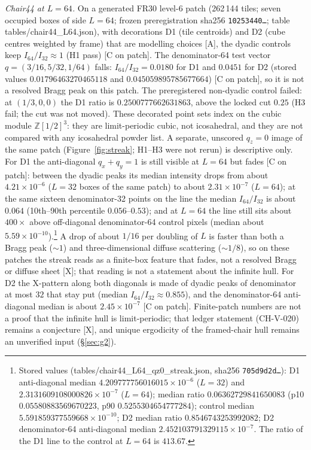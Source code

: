\documentclass[11pt]{article}
\begin{document}
\emph{Chair44 at $L=64$.} On a generated FR30 level-6 patch (262\,144 tiles; seven occupied boxes of side $L=64$; frozen preregistration sha256 \texttt{10253440\ldots}; table tables/chair44\_L64.json), with decorations D1 (tile centroids) and D2 (cube centres weighted by frame) that are modelling choices [A], the dyadic controls keep $I_{64}/I_{32}\approx1$ (H1 pass) [C on patch]. The denominator-64 test vector $q=(3/16,5/32,1/64)$ falls: $I_{64}/I_{32}=0.0180$ for D1 and $0.0451$ for D2 (stored values $0.01796463270465118$ and $0.045059895785677664$) [C on patch], so it is not a resolved Bragg peak on this patch. The preregistered non-dyadic control failed: at $(1/3,0,0)$ the D1 ratio is $0.2500777662631863$, above the locked cut $0.25$ (H3 fail; the cut was not moved). These decorated point sets index on the cubic module $\mathbb{Z}[1/2]^3$: they are limit-periodic cubic, not icosahedral, and they are not compared with any icosahedral powder list. A separate, unscored $q_z=0$ image of the same patch (Figure~\ref{fig:streak}; H1--H3 were not rerun) is descriptive only. For D1 the anti-diagonal $q_x+q_y=1$ is still visible at $L=64$ but fades [C on patch]: between the dyadic peaks its median intensity drops from about $4.21\times10^{-6}$ ($L=32$ boxes of the same patch) to about $2.31\times10^{-7}$ ($L=64$); at the same sixteen denominator-32 points on the line the median $I_{64}/I_{32}$ is about $0.064$ (10th--90th percentile $0.056$--$0.53$); and at $L=64$ the line still sits about $400\times$ above off-diagonal denominator-64 control pixels (median about $5.59\times10^{-10}$).\footnote{Stored values (tables/chair44\_L64\_qz0\_streak.json, sha256 \texttt{705d9d2d\ldots}): D1 anti-diagonal median $4.209777756016015\times10^{-6}$ ($L=32$) and $2.3131609108000826\times10^{-7}$ ($L=64$); median ratio $0.06362729841650083$ (p10 $0.05580883569670223$, p90 $0.5255304654777284$); control median $5.591859377559668\times10^{-10}$; D2 median ratio $0.8546743253992082$; D2 denominator-64 anti-diagonal median $2.452103791329115\times10^{-7}$. The ratio of the D1 line to the control at $L=64$ is $413.67$.} A drop of about $1/16$ per doubling of $L$ is faster than both a Bragg peak ($\sim1$) and three-dimensional diffuse scattering ($\sim1/8$), so on these patches the streak reads as a finite-box feature that fades, not a resolved Bragg or diffuse sheet [X]; that reading is not a statement about the infinite hull. For D2 the X-pattern along both diagonals is made of dyadic peaks of denominator at most $32$ that stay put (median $I_{64}/I_{32}\approx0.855$), and the denominator-64 anti-diagonal median is about $2.45\times10^{-7}$ [C on patch]. Finite-patch numbers are not a proof that the infinite hull is limit-periodic; that ledger statement (CH-V-020) remains a conjecture [X], and unique ergodicity of the framed-chair hull remains an unverified input (\S\ref{sec:g2}).
\end{document}
